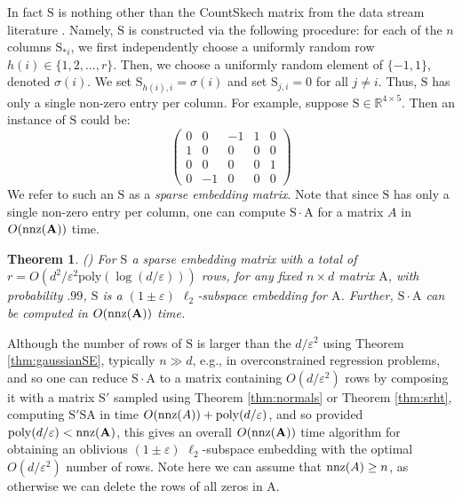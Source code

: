 \documentclass[11pt]{article}
\newtheorem{theorem}{Theorem}
\newcommand{\mat}[1]{{\ensuremath{\bm{\mathrm{#1}}}}}
\def\matA{\mat{A}}
\def\matS{\mat{S}}
\def\nnz{{ \rm nnz }}
\newcommand{\eps}{\varepsilon}
\newcommand{\poly}{{\mathrm{poly}}}
\begin{document}
In fact $\matS$ is nothing other than the {\sf CountSkech} matrix from the data stream literature 
\cite{ccf04,tz12}.
Namely, $\matS$ is constructed via the following procedure: for each of the $n$ columns $\matS_{*i}$, 
we first independently choose a 
uniformly random row
$h(i) \in \{1, 2, \ldots, r\}$. Then, we choose a uniformly random element of $\{-1, 1\}$, denoted $\sigma(i)$. We set $\matS_{h(i), i} = \sigma(i)$ and set $\matS_{j,i} = 0$ for all $j \neq i$. 
Thus, $\matS$ has only a single non-zero entry per column. For example, suppose $\matS \in \mathbb{R}^{4 \times 5}$. Then an instance of $\matS$ could
be:
\[ \left( \begin{array}{ccccc}
0 & 0 & -1 & 1 & 0\\
1 & 0 & 0 & 0 & 0\\
0 & 0 & 0 & 0 & 1\\
0 & -1 & 0 & 0 & 0\end{array} \right)\]
We refer to such an $\matS$ as a {\em sparse embedding matrix}. Note that since $\matS$ has only a single non-zero
entry per column, one can compute $\matS \cdot \matA$ for a matrix $A$ in $O(\nnz(\matA))$ time. 
\begin{theorem}\label{thm:cw}(\cite{CW13})
For $\matS$ a sparse embedding matrix with a total of $r = O(d^2/\eps^2 \poly(\log(d/\eps)))$ rows, for any fixed $n \times d$
matrix $\matA$, with probability $.99$, $\matS$ is a $(1 \pm \eps)$ $\ell_2$-subspace embedding for $\matA$. Further,
$\matS \cdot \matA$ can be computed in $O(\nnz(\matA))$ time. 
\end{theorem}
Although the number of rows of $\matS$ is larger than the $d/\eps^2$ using Theorem \ref{thm:gaussianSE}, 
typically $n \gg d$, e.g., in overconstrained regression problems, and so one can reduce $\matS \cdot \matA$
to a matrix containing $O(d/\eps^2)$ rows by composing it with a matrix $\matS'$ sampled using Theorem \ref{thm:normals}
or Theorem \ref{thm:srht},
computing $\matS' \matS \matA$ in time $O(\nnz(A)) + \poly(d/\eps)$, and so provided $\poly(d/\eps) < \nnz(\matA)$, 
this gives an overall $O(\nnz(\matA))$ time algorithm for obtaining an oblivious $(1 \pm \eps)$ $\ell_2$-subspace embedding
with the optimal $O(d/\eps^2)$ number of rows. Note here we can assume that 
$\nnz(A) \geq n$, as otherwise we can delete the rows of all zeros in $\matA$. 
\end{document}
